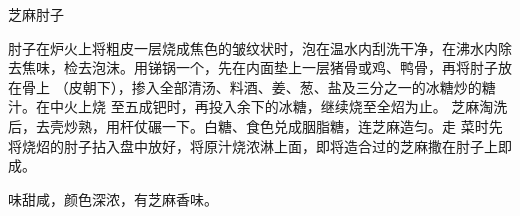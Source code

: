 \begin{recipe}{芝麻肘子}

\ingredients


\cooking

\step 肘子在炉火上将粗皮一层烧成焦色的皱纹状时，泡在温水内刮洗干净，在沸水内除
去焦味，检去泡沫。用锑锅一个，先在内面垫上一层猪骨或鸡、鸭骨，再将肘子放在骨上
（皮朝下），掺入全部清汤、料酒、姜、葱、盐及三分之一的冰糖炒的糖汁。在中火上烧
至五成钯时，再投入余下的冰糖，继续烧至全炤为止。
\step 芝麻淘洗后，去壳炒熟，用杆仗碾一下。白糖、食色兑成胭脂糖，连芝麻造匀。走
菜时先将烧炤的肘子拈入盘中放好，将原汁烧浓淋上面，即将造合过的芝麻撒在肘子上即
成。

\notes

味甜咸，颜色深浓，有芝麻香味。

\end{recipe}

